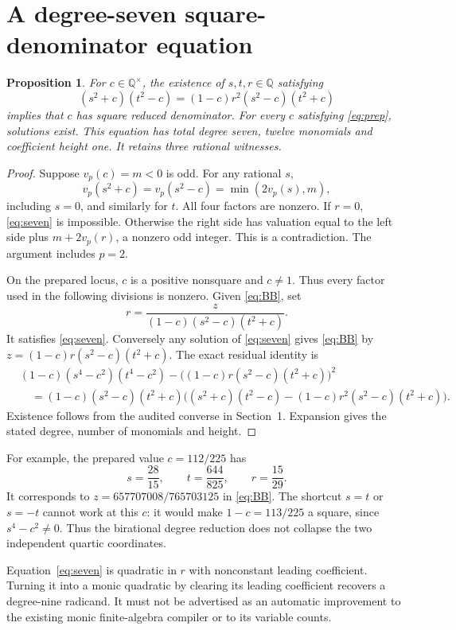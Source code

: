 \documentclass[11pt,a4paper]{article}
\newtheorem{proposition}[theorem]{Proposition}
\theoremstyle{remark}\newtheorem{remark}[theorem]{Remark}
\newcommand{\Q}{\mathbb Q}\newcommand{\Z}{\mathbb Z}\newcommand{\F}{\mathbb F}
\begin{document}
\section{A degree-seven square-denominator equation}
\begin{proposition}\label{prop:seven}
For $c\in\Q^\times$, the existence of $s,t,r\in\Q$ satisfying
\begin{equation}\label{eq:seven}
 (s^2+c)(t^2-c)=(1-c)r^2(s^2-c)(t^2+c)
\end{equation}
implies that $c$ has square reduced denominator. For every $c$
satisfying \eqref{eq:prep}, solutions exist. This equation has total
degree seven, twelve monomials and coefficient height one.
It retains three rational witnesses.
\end{proposition}
\begin{proof}
Suppose $v_p(c)=m<0$ is odd. For any rational $s$,
\[
 v_p(s^2+c)=v_p(s^2-c)=\min(2v_p(s),m),
\]
including $s=0$, and similarly for $t$. All four factors are nonzero.
If $r=0$, \eqref{eq:seven} is impossible. Otherwise the right side
has valuation equal to the left side plus $m+2v_p(r)$, a nonzero
odd integer. This is a contradiction. The argument includes $p=2$.

On the prepared locus, $c$ is a positive nonsquare and $c\ne1$.
Thus every factor used in the following divisions is nonzero.
Given \eqref{eq:BB}, set
\[
 r=\frac{z}{(1-c)(s^2-c)(t^2+c)}.
\]
It satisfies \eqref{eq:seven}. Conversely any solution of
\eqref{eq:seven} gives \eqref{eq:BB} by
$z=(1-c)r(s^2-c)(t^2+c)$. The exact residual identity is
\begin{align*}
 &(1-c)(s^4-c^2)(t^4-c^2)
   -\bigl((1-c)r(s^2-c)(t^2+c)\bigr)^2\\
 &\quad=(1-c)(s^2-c)(t^2+c)
 \bigl((s^2+c)(t^2-c)-(1-c)r^2(s^2-c)(t^2+c)\bigr).
\end{align*}
Existence follows from the audited converse in Section~1. Expansion
gives the stated degree, number of monomials and height.
\end{proof}

For example, the prepared value $c=112/225$ has
\[
 s=\frac{28}{15},\qquad t=\frac{644}{825},\qquad r=\frac{15}{29}.
\]
It corresponds to $z=657707008/765703125$ in \eqref{eq:BB}.
The shortcut $s=t$ or $s=-t$ cannot work at this $c$: it would
make $1-c=113/225$ a square, since $s^4-c^2\ne0$.
Thus the birational degree reduction does not collapse the two
independent quartic coordinates.

Equation~\eqref{eq:seven} is quadratic in $r$ with nonconstant
leading coefficient. Turning it into a monic quadratic by clearing
its leading coefficient recovers a degree-nine radicand. It must not
be advertised as an automatic improvement to the existing monic
finite-algebra compiler or to its variable counts.
\end{document}
